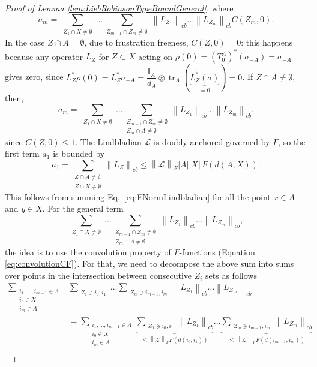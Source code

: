 \documentclass[11pt]{article}
\numberwithin{equation}{section}
\numberwithin{figure}{section}
\numberwithin{table}{section}
\theoremstyle{definition}
\theoremstyle{plain}
\theoremstyle{remark}
\newcommand{\Z}{\mathbb{Z}}
\newcommand{\Id}{\mathbb{I}}
\newcommand{\Li}{\mathcal{L}}
\newcommand{\La}{\Lambda}
\newcommand{\normm}[2]{\left\lVert#1\right\rVert_{#2}}
\newcommand{\summ}[1]{\sum\limits_{\substack{ #1 }}}
\newcommand{\tr}{\operatorname{tr}}
\newcommand{\abs}[1]{\left \vert#1\right\vert}
\begin{document}
\begin{proof}[Proof of Lemma \ref{lem:LiebRobinsonTypeBoundGeneral}]
where
\begin{equation}
    a_m=\summ{Z_1\cap X\neq \emptyset}\dots \summ{Z_{m-1}\cap Z_m\neq \emptyset}\normm{L_{Z_1}}{cb}\dots \normm{L_{Z_m}}{cb}C(Z_m,0).
\end{equation}
In the case $Z\cap A=\emptyset$, due to frustration freeness, $C(Z,0)=0$: this happens because any operator $L_Z$ for $Z\subset X$  acting on $\rho(0)=(T^\Lambda_0)^*(\sigma_{-A})=\sigma_{-A}$ gives zero, since $L_Z^*\rho(0)=L_Z^*\sigma_{-A}=\dfrac{\Id_A}{d_A}\otimes \tr_A(\underbrace{L_Z^*(\sigma)}_{=0})=0$. If $Z\cap A\neq \emptyset$, then,
\begin{equation}
    a_m=\summ{Z_1\cap X\neq \emptyset}\dots \summ{Z_{m-1}\cap Z_m\neq \emptyset\\Z_m\cap A\neq \emptyset }\normm{L_{Z_1}}{cb}\dots \normm{L_{Z_m}}{cb}.
\end{equation}
since $C(Z,0)\leq 1$. The Lindbladian $\mathcal{L}$ is doubly anchored governed by $F$, so the first term $a_1$ is bounded by 
\begin{equation}
    a_1=\summ{Z\cap A\neq \emptyset\\Z\cap X\neq \emptyset}\normm{L_{Z}}{cb}\leq \normm{\Li}{F}\abs{A}\abs{X} \, F(d(A,X)).
\end{equation}
This follows from summing Eq.~\eqref{eq:FNormLindbladian} for all the point $x\in A$ and $y\in X$.
For the general term
\begin{equation}
    \summ{Z_1\cap X\neq \emptyset}\dots \summ{Z_{m-1}\cap Z_m\neq \emptyset\\Z_m\cap A\neq \emptyset }\normm{L_{Z_1}}{cb}\dots \normm{L_{Z_m}}{cb},
\end{equation}
the idea is to use the convolution property of $F$-functions (Equation \eqref{eq:convolutionCF}). For that, we need to decompose the above sum into sums over points in the intersection between consecutive $Z_i$ sets as follows
\begin{align}
    \summ{i_1,\dots,i_{m-1}\in \La\\i_0\in X\\i_m\in A}&\summ{Z_1\ni i_0,i_1}\dots \summ{Z_m \ni i_{m-1},i_m}\normm{L_{Z_1}}{cb}\dots \normm{L_{Z_m}}{cb}\\
    &\nonumber=\summ{i_1,\dots,i_{m-1}\in \La\\i_0\in X\\i_m\in A}\underbrace{\summ{Z_1\ni i_0,i_1}\normm{L_{Z_1}}{cb}}_{\leq \normm{\Li}{F}F(d(i_0,i_1))}\dots \underbrace{\summ{Z_m \ni i_{m-1},i_m}\normm{L_{Z_m}}{cb}}_{\leq \normm{\Li}{F}F(d(i_{m-1},i_m))}\\

\end{align}
\end{proof}
\end{document}
